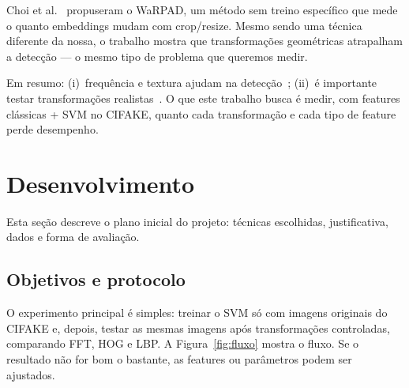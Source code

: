 \documentclass[12pt]{article}
\begin{document}
Choi et al.~\cite{choi2025warpad} propuseram o WaRPAD, um método sem treino específico que mede o quanto embeddings mudam com crop/resize. Mesmo sendo uma técnica diferente da nossa, o trabalho mostra que transformações geométricas atrapalham a detecção --- o mesmo tipo de problema que queremos medir.

Em resumo: (i)~frequência e textura ajudam na detecção~\cite{frank2020frequency,bammey2024synthbuster,nirob2026handcrafted}; (ii)~é importante testar transformações realistas~\cite{choi2025warpad,bammey2024synthbuster}. O que este trabalho busca é medir, com features clássicas + SVM no CIFAKE, quanto cada transformação e cada tipo de feature perde desempenho.

\section{Desenvolvimento}

Esta seção descreve o plano inicial do projeto: técnicas escolhidas, justificativa, dados e forma de avaliação.

\subsection{Objetivos e protocolo}

O experimento principal é simples: treinar o SVM só com imagens originais do CIFAKE e, depois, testar as mesmas imagens após transformações controladas, comparando FFT, HOG e LBP. A Figura~\ref{fig:fluxo} mostra o fluxo. Se o resultado não for bom o bastante, as features ou parâmetros podem ser ajustados.
\end{document}
